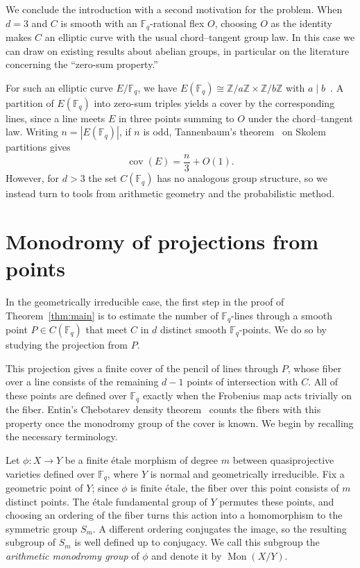 \documentclass[12pt,reqno]{amsart}
\theoremstyle{definition}
\theoremstyle{remark}
\newcommand{\Fq}{\mathbb{F}_q}
\begin{document}
We conclude the introduction with a second motivation for the problem. When $d=3$ and $C$ is smooth with an $\Fq$-rational flex $O$, choosing $O$ as the identity makes $C$ an elliptic curve with the usual chord--tangent group law. In this case we can draw on existing results about abelian groups, in particular on the literature concerning the ``zero-sum property.''

For such an elliptic curve $E/\Fq$, we have
$E(\Fq)\cong\mathbb{Z}/a\mathbb{Z}\times\mathbb{Z}/b\mathbb{Z}$ with
$a\mid b$~\cite[Theorem~4.1, p.~97]{Was08}. A partition of $E(\Fq)$ into zero-sum triples yields a cover by the corresponding lines, since a line meets $E$ in three points summing to $O$ under the chord--tangent law. Writing $n=|E(\Fq)|$, if $n$ is odd, Tannenbaum's theorem~\cite{Tan81} on Skolem partitions gives
\[
\operatorname{cov}(E)=\frac{n}{3}+O(1).
\]
However, for $d>3$ the set $C(\Fq)$ has no analogous group structure, so we instead turn to tools from arithmetic geometry and the probabilistic method.

\section{Monodromy of projections from points}\label{sec:projection-monodromy}

In the geometrically irreducible case, the first step in the proof of Theorem~\ref{thm:main} is to estimate the number of $\Fq$-lines through a smooth point $P\in C(\Fq)$ that meet $C$ in $d$ distinct smooth $\Fq$-points. We do so by studying the projection from $P$.

This projection gives a finite cover of the pencil of lines through $P$, whose fiber over a line consists of the remaining $d-1$ points of intersection with $C$. All of these points are defined over $\Fq$ exactly when the Frobenius map acts trivially on the fiber. Entin's Chebotarev density theorem~\cite{Ent21} counts the fibers with this property once the monodromy group of the cover is known. We begin by recalling the necessary terminology.

Let $\phi\colon X\to Y$ be a finite \'etale morphism of degree $m$ between quasiprojective varieties defined over $\Fq$, where $Y$ is normal and geometrically irreducible. Fix a geometric point of $Y$; since $\phi$ is finite \'etale, the fiber over this point consists of $m$ distinct points. The \'etale fundamental group of $Y$ permutes these points, and choosing an ordering of the fiber turns this action into a homomorphism to the symmetric group $S_m$. A different ordering conjugates the image, so the resulting subgroup of $S_m$ is well defined up to conjugacy. We call this subgroup the \emph{arithmetic monodromy group} of $\phi$ and denote it by $\operatorname{Mon}(X/Y)$.
\end{document}
